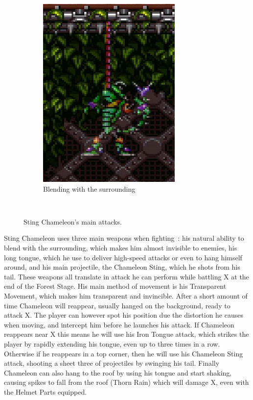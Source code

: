 \begin{figure}[htp]
\begin{subfigure}[t]{0.27\linewidth}
		\includegraphics[width=\linewidth]{figures/X1/Sting_chameleon/Chameleon_blend.jpg}
		\caption{Blending with the surrounding}
	\end{subfigure}\\
	\caption{Sting Chameleon's main attacks.}
\end{figure} 
Sting Chameleon uses three main weapons when fighting~\cite{wiki:Sting_chameleon}: his natural ability to blend with the surrounding, which makes him almost invisible to enemies, his long tongue, which he use to deliver high-speed attacks or even to hang himself around, and his main projectile, the Chameleon Sting, which he shots from his tail. These weapons all translate in attack he can perform while battling X at the end of the Forest Stage. His main method of movement is his Transparent Movement, which makes him transparent and invincible. After a short amount of time Chameleon will reappear, usually hanged on the background, ready to attack X. The player can however spot his position due the distortion he causes when moving, and intercept him before he launches his attack. If Chameleon reappears near X this means he will use his Iron Tongue attack, which strikes the player by rapidly extending his tongue, even up to three times in a row. Otherwise if he reappears in a top corner, then he will use his Chameleon Sting attack, shooting a sheet three of projectiles by swinging his tail. Finally Chameleon can also hang to the roof by using his tongue and start shaking, causing spikes to fall from the roof (Thorn Rain) which will damage X, even with the Helmet Parts equipped.

